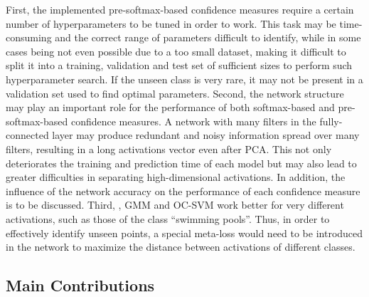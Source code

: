 \documentclass[10pt]{article}
\begin{document}
First, the implemented pre-softmax-based confidence measures require a certain number of hyperparameters to be tuned in order to work. This task may be time-consuming and the correct range of parameters difficult to identify, while in some cases being not even possible due to a too small dataset, making it difficult to split it into a training, validation and test set of sufficient sizes to perform such hyperparameter search. If the unseen class is very rare, it may not be present in a validation set used to find optimal parameters. Second, the network structure may play an important role for the performance of both softmax-based and pre-softmax-based confidence measures. A network with many filters in the fully-connected layer may produce redundant and noisy information spread over many filters, resulting in a long activations vector even after \gls{PCA}. This not only deteriorates the training and prediction time of each model but may also lead to greater difficulties in separating high-dimensional activations. In addition, the influence of the network accuracy on the performance of each confidence measure is to be discussed. Third, , \gls{GMM} and \gls{OC-SVM} work better for very different activations, such as those of the class ``swimming pools''. Thus, in order to effectively identify unseen points, a special meta-loss would need to be introduced in the network to maximize the distance between activations of different classes.

\subsection{Main Contributions}
\end{document}
